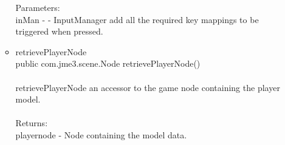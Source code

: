 \documentclass[letterpaper]{article}
\begin{document}
\begin{itemize}
\begin{itemize}
															Parameters: \\
															inMan - - InputManager add all the required key mappings to be triggered when pressed.
													\item	retrievePlayerNode \\
															public com.jme3.scene.Node retrievePlayerNode() \\ \\
															retrievePlayerNode an accessor to the game node containing the player model. \\ \\
															Returns: \\
															playernode - Node containing the model data.
												\end{itemize}
									\end{itemize}
								
								\vspace{0.2in}
\end{document}
